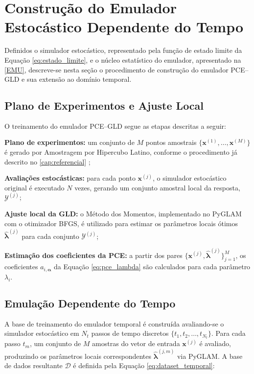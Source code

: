 \section{Construção do Emulador Estocástico Dependente do Tempo}
\label{sec:construcao_emulador}

Definidos o simulador estocástico, representado pela função de estado limite da Equação \eqref{eq:estado_limite}, e o núcleo estatístico do emulador, apresentado na \autoref{EMU}, descreve-se nesta seção o procedimento de construção do emulador PCE--GLD e sua extensão ao domínio temporal.

\subsection{Plano de Experimentos e Ajuste Local}

O treinamento do emulador PCE--GLD segue as etapas descritas a seguir:

\begin{alineas}
    \item \textbf{Plano de experimentos:} um conjunto de $M$ pontos amostrais $\{\mathbf{x}^{(1)}, \dots, \mathbf{x}^{(M)}\}$ é gerado por Amostragem por Hipercubo Latino, conforme o procedimento já descrito no \autoref{cap:referencial} \cite{mckay_comparison_1979};
    \item \textbf{Avaliações estocásticas:} para cada ponto $\mathbf{x}^{(j)}$, o simulador estocástico original é executado $N$ vezes, gerando um conjunto amostral local da resposta, $\mathcal{Y}^{(j)}$;
    \item \textbf{Ajuste local da GLD:} o Método dos Momentos, implementado no PyGLAM com o otimizador BFGS, é utilizado para estimar os parâmetros locais ótimos $\hat{\boldsymbol{\lambda}}^{(j)}$ para cada conjunto $\mathcal{Y}^{(j)}$;
    \item \textbf{Estimação dos coeficientes da PCE:} a partir dos pares $\{\mathbf{x}^{(j)}, \hat{\boldsymbol{\lambda}}^{(j)}\}_{j=1}^{M}$, os coeficientes $a_{i, \boldsymbol{\alpha}}$ da Equação \eqref{eq:pce_lambda} são calculados para cada parâmetro $\lambda_i$.
\end{alineas}

\subsection{Emulação Dependente do Tempo}

A base de treinamento do emulador temporal é construída avaliando-se o simulador estocástico em $N_t$ passos de tempo discretos $\{t_1, t_2, \dots, t_{N_t}\}$. Para cada passo $t_m$, um conjunto de $M$ amostras do vetor de entrada $\mathbf{x}^{(j)}$ é avaliado, produzindo os parâmetros locais correspondentes $\hat{\boldsymbol{\lambda}}^{(j, m)}$ via PyGLAM. A base de dados resultante $\mathcal{D}$ é definida pela Equação \eqref{eq:dataset_temporal}:


